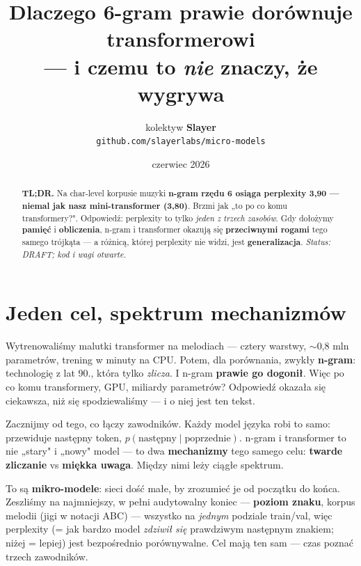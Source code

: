 \documentclass[11pt,a4paper]{article}
\title{Dlaczego 6-gram prawie dorównuje transformerowi\\
\large --- i czemu to \emph{nie} znaczy, że wygrywa}
\author{kolektyw \textbf{Slayer} \\ \texttt{github.com/slayerlabs/micro-models}}
\date{czerwiec 2026}
\begin{document}
\maketitle

\begin{abstract}
\noindent\textbf{TL;DR.} Na char-level korpusie muzyki \textbf{n-gram rzędu 6 osiąga perplexity 3,90 --- niemal jak nasz mini-transformer (3,80)}. Brzmi jak „to po co komu transformery?". Odpowiedź: perplexity to tylko \emph{jeden z trzech zasobów}. Gdy dołożymy \textbf{pamięć} i \textbf{obliczenia}, n-gram i transformer okazują się \textbf{przeciwnymi rogami} tego samego trójkąta --- a różnicą, której perplexity nie widzi, jest \textbf{generalizacja}. \emph{Status: DRAFT; kod i wagi otwarte.}
\end{abstract}

\section{Jeden cel, spektrum mechanizmów}
Wytrenowaliśmy malutki transformer na melodiach --- cztery warstwy, $\sim$0,8 mln parametrów, trening w minuty na CPU. Potem, dla porównania, zwykły \textbf{n-gram}: technologię z lat 90., która tylko \emph{zlicza}. I n-gram \textbf{prawie go dogonił}. Więc po co komu transformery, GPU, miliardy parametrów? Odpowiedź okazała się ciekawsza, niż się spodziewaliśmy --- i o niej jest ten tekst.

Zacznijmy od tego, co łączy zawodników. Każdy model języka robi to samo: przewiduje następny token, $p(\text{następny}\mid\text{poprzednie})$. n-gram i transformer to nie „stary" i „nowy" model --- to dwa \textbf{mechanizmy} tego samego celu: \textbf{twarde zliczanie} vs \textbf{miękka uwaga}. Między nimi leży ciągłe spektrum.

To są \textbf{mikro-modele}: sieci dość małe, by zrozumieć je od początku do końca. Zeszliśmy na najmniejszy, w pełni audytowalny koniec --- \textbf{poziom znaku}, korpus melodii (jigi w notacji ABC) --- wszystko na \emph{jednym} podziale train/val, więc perplexity (= jak bardzo model \emph{zdziwił się} prawdziwym następnym znakiem; niżej = lepiej) jest bezpośrednio porównywalne. Cel mają ten sam --- czas poznać trzech zawodników.
\end{document}

